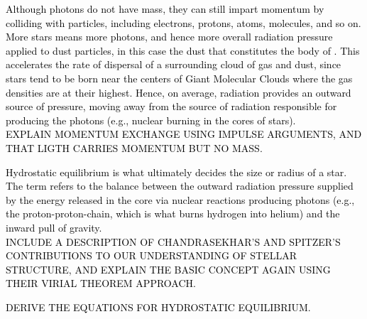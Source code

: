 \documentclass[main.tex]{subfiles}
\begin{document}
\begin{tcolorbox}[sharp corners, colback=green!30, colframe=green!80!blue, title=Box \refstepcounter{educhap1}\label{boxchap1:radpress}\ref{boxchap1:radpress} -- Radiation Pressure]
\par \textcolor{black} {Although photons do not have mass, they can still impart momentum by colliding with particles, including electrons, protons, atoms, molecules, and so on.  More stars means more photons, and hence more overall radiation pressure applied to dust particles, in this case the dust that constitutes the body of \rmpleione.  This accelerates the rate of dispersal of a surrounding cloud of gas and dust, since stars tend to be born near the centers of Giant Molecular Clouds where the gas densities are at their highest.  Hence, on average, radiation provides an outward source of pressure, moving away from the source of radiation responsible for producing the photons (e.g., nuclear burning in the cores of stars). \\
EXPLAIN MOMENTUM EXCHANGE USING IMPULSE ARGUMENTS, AND THAT LIGTH CARRIES MOMENTUM BUT NO MASS.}  %
\end{tcolorbox}

\begin{tcolorbox}[sharp corners, colback=blue!30, colframe=blue!80!blue, title=Box \refstepcounter{educhap1}\label{boxchap1:he1}\ref{boxchap1:he1} -- Hydrostatic Equilibrium I]
\par \textcolor{black} {Hydrostatic equilibrium is what ultimately decides the size or radius of a star.  The term refers to the balance between the outward radiation pressure supplied by the energy released in the core via nuclear reactions producing photons (e.g., the proton-proton-chain, which is what burns hydrogen into helium) and the inward pull of gravity. \\
INCLUDE A DESCRIPTION OF CHANDRASEKHAR'S AND SPITZER'S CONTRIBUTIONS TO OUR UNDERSTANDING OF STELLAR STRUCTURE, AND EXPLAIN THE BASIC CONCEPT AGAIN USING THEIR VIRIAL THEOREM APPROACH.}
\end{tcolorbox}


\begin{tcolorbox}[sharp corners, colback=green!30, colframe=green!80!blue, title=Box \refstepcounter{educhap1}\label{boxchap1:he2}\ref{boxchap1:he2} -- Hdrostatic Equilibrium II]
\par \textcolor{black} {DERIVE THE EQUATIONS FOR HYDROSTATIC EQUILIBRIUM.}
\end{tcolorbox}
\end{document}

